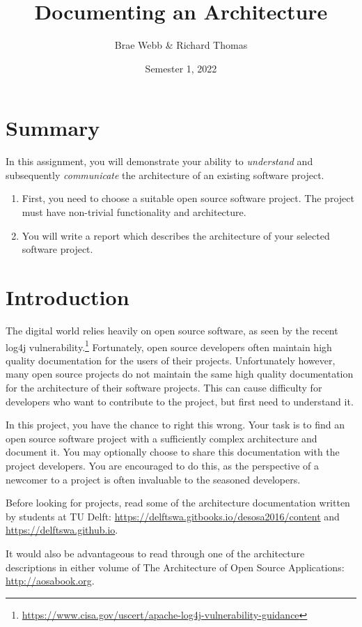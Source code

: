\documentclass{csse4400}
\title{Documenting an Architecture}
\author{Brae Webb \& Richard Thomas}
\date{Semester 1, 2022}
\begin{document}
\maketitle

\section*{Summary}
In this assignment, you will demonstrate your ability to \textsl{understand}
and subsequently \textsl{communicate} the architecture of an existing software project.
\begin{enumerate}
    \item First, you need to choose a suitable open source software project.
             The project must have non-trivial functionality and architecture.
    \item You will write a report which describes the architecture of your selected software project.
\end{enumerate}


\section{Introduction}
The digital world relies heavily on open source software, as seen by the recent log4j vulnerability.\footnote{\url{https://www.cisa.gov/uscert/apache-log4j-vulnerability-guidance}}
Fortunately, open source developers often maintain high quality documentation for the users of their projects.
Unfortunately however, many open source projects do not maintain the same high quality documentation for the architecture of their software projects.
This can cause difficulty for developers who want to contribute to the project, but first need to understand it.

In this project, you have the chance to right this wrong.
Your task is to find an open source software project with a sufficiently complex architecture and document it.
You may optionally choose to share this documentation with the project developers.
You are encouraged to do this, as the perspective of a newcomer to a project is often invaluable to the seasoned developers.

Before looking for projects, read some of the architecture documentation written by students at TU Delft:
\url{https://delftswa.gitbooks.io/desosa2016/content} and \url{https://delftswa.github.io}.

It would also be advantageous to read through one of the architecture descriptions in either volume of
The Architecture of Open Source Applications: \url{http://aosabook.org}.
\end{document}
